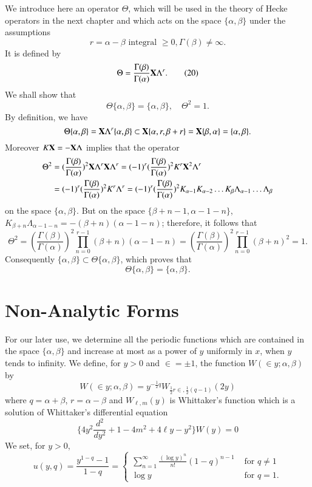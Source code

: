 We introduce \pageoriginale here an operator $\Theta$, which will be
used in the theory of Hecke operators in the next chapter and which
acts on the space $\{\alpha, \beta\}$ under the assumptions
$$
r=\alpha-\beta \text{ integral } \geq 0, \Gamma(\beta) \neq \infty. 
$$
It is defined by
\begin{equation*}
\Theta = \frac{\Gamma(\beta)}
{\Gamma(\alpha)} \mathbf{X} \Lambda^r. \tag{20}\label{c4:eq1:20}
\end{equation*}
We shall show that 
$$
\Theta \{\alpha,\beta\} = \{\alpha, \beta\}, \quad \Theta^2 =1.
$$
By definition, we have
$$
\Theta\{\alpha, \beta\} = \mathbf{X} \Lambda^r \{\alpha, \beta\} \subset \mathbf{X}
\{\alpha, r, \beta+r\} = \mathbf{X} \{\beta, \alpha\} = \{\alpha, \beta\}.
$$
Moreover $K\mathbf{X}=-\mathbf{X} \Lambda$ implies that the operator 
\begin{align*}
\Theta^2 & = (\frac{\Gamma(\beta)}{\Gamma(\alpha)})^2 \mathbf{X} \Lambda^r
\mathbf{X} \Lambda^r = (-1)^r (\frac{\Gamma(\beta)}{\Gamma(\alpha)})^2 K^r
\mathbf{X}^2 \Lambda^r\\
& = (-1)^r (\frac{\Gamma(\beta)}{\Gamma(\alpha)})^2 K^r \Lambda^r
=(-1)^r (\frac{\Gamma(\beta)}{\Gamma(\alpha)})^2 K_{\alpha-1}
K_{\alpha-2} \ldots K_{\beta} \Lambda_{\alpha-1} \ldots \Lambda_{\beta}
\end{align*}
on the space $\{\alpha, \beta\}$.
But on the space $\{\beta+n-1, \alpha-1-n\}$,
$K_{\beta+n}\Lambda_{\alpha-1-n}=-(\beta + n)(\alpha-1-n)$; therefore,
it follows that 
$$
\Theta^2 = (\frac{\Gamma(\beta)}{\Gamma(\alpha)})^2 \prod^{r-1}_{n=0}
(\beta+n) (\alpha-1-n) = (\frac{\Gamma(\beta)}{\Gamma(\alpha)})^2
\prod^{r-1}_{n=0} (\beta+n)^2=1.
$$
Consequently $\{\alpha, \beta\} \subset \Theta \{\alpha, \beta\}$,
which proves that
$$
\Theta \{\alpha, \beta\} = \{\alpha,\beta\}.
$$

\section{Non-Analytic Forms}\label{chap4:sec2}\pageoriginale

For our later use, we determine all the periodic functions which are
contained in the space $\{\alpha, \beta\}$ and increase at most as a
power of $y$ uniformly in $x$, when $y$ tends to infinity. We define,
for $y>0$ and $\in = \pm 1$, the function $W(\in y ;
\alpha, \beta)$ by
\begin{equation*}
W (\in y; \alpha, \beta) = y^{-\frac{1}{2}q}
W_{\frac{1}{2}r\in, \frac{1}{2} (q-1)} (2y) \tag{1}\label{c4:eq2:1}
\end{equation*}
where $q=\alpha+\beta$, $r=\alpha-\beta$ and $W_{\ell,m}(y)$ is
Whittaker's function which is a solution of Whittaker's differential
equation
\begin{equation*}
\{4y^2 \frac{d^2}{dy^2} + 1 - 4m^2 + 
4 \ell y - y^2\} W(y) =0 \tag{2}\label{c4:eq2:2}
\end{equation*}
We set, for $y>0$,
$$
u(y,q) = \frac{y^{1-q}-1}{1-q} = 
\begin{cases}
\sum^{\infty}_{n=1} \frac{(\log y)^n}{n!} (1-q)^{n-1} & \text{ for } q
\neq 1\\
\log y &\text{ for } q=1.
\end{cases}
$$

